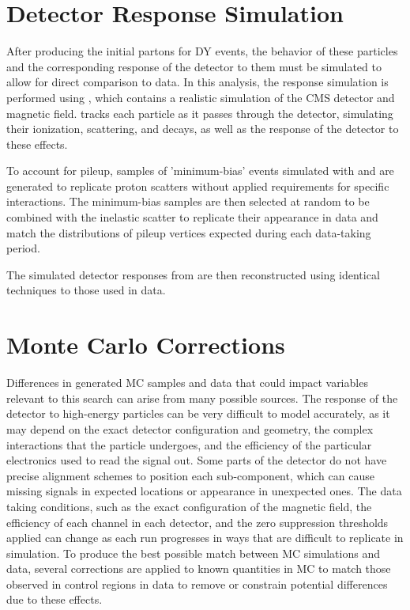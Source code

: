 \section{Detector Response Simulation}

After producing the initial partons for DY events, the behavior of these particles and the corresponding response of the detector to them must be simulated to allow for direct comparison to data.
In this analysis, the response simulation is performed using \geant \cite{geantRef}, which contains a realistic simulation of the CMS detector and magnetic field.
\geant tracks each particle as it passes through the detector, simulating their ionization, scattering, and decays, as well as the response of the detector to these effects.

To account for pileup, samples of 'minimum-bias' events simulated with \pythia and \geant are generated to replicate proton scatters without applied requirements for specific interactions.
The minimum-bias samples are then selected at random to be combined with the inelastic scatter to replicate their appearance in data and match the distributions of pileup vertices expected during each data-taking period.

The simulated detector responses from \geant are then reconstructed using identical techniques to those used in data. 

\section{Monte Carlo Corrections}
Differences in generated MC samples and data that could impact variables relevant to this search can arise from many possible sources.
The response of the detector to high-energy particles can be very difficult to model accurately, as it may depend on the exact detector configuration and geometry, the complex interactions that the particle undergoes, and the efficiency of the particular electronics used to read the signal out.
Some parts of the detector do not have precise alignment schemes to position each sub-component, which can cause missing signals in expected locations or appearance in unexpected ones. 
The data taking conditions, such as the exact configuration of the magnetic field, the efficiency of each channel in each detector, and the zero suppression thresholds applied can change as each run progresses in ways that are difficult to replicate in simulation.
To produce the best possible match between MC simulations and data, several corrections are applied to known quantities in MC to match those observed in control regions in data to remove or constrain potential differences due to these effects.

